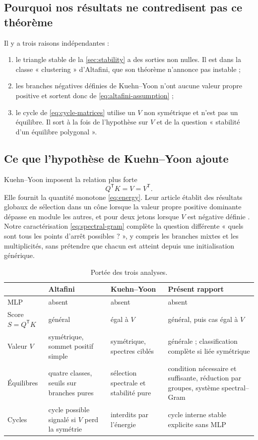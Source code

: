 \documentclass[11pt,a4paper]{article}
\theoremstyle{definition}
\newcommand{\T}{\mathsf T}
\begin{document}
\subsection{Pourquoi nos résultats ne contredisent pas ce théorème}

Il y a trois raisons indépendantes :

\begin{enumerate}
  \item le triangle stable de la \cref{sec:stability} a des sorties non nulles. Il est dans
  la classe « clustering » d'Altafini, que son théorème n'annonce pas instable ;
  \item les branches négatives définies de Kuehn--Yoon n'ont aucune valeur propre
  positive et sortent donc de \eqref{eq:altafini-assumption} ;
  \item le cycle de \eqref{eq:cycle-matrices} utilise un $V$ non symétrique et n'est pas
  un équilibre. Il sort à la fois de l'hypothèse sur $V$ et de la question « stabilité d'un
  équilibre polygonal ».
\end{enumerate}

\subsection{Ce que l'hypothèse de Kuehn--Yoon ajoute}

Kuehn--Yoon imposent la relation plus forte
\[
 Q^{\T}K=V=V^{\T}.
\]
Elle fournit la quantité monotone \eqref{eq:energy}. Leur article établit des résultats
globaux de sélection dans un cône lorsque la valeur propre positive dominante dépasse en
module les autres, et pour deux jetons lorsque $V$ est négative définie
\cite{kuehnyoon2026spectral}. Notre caractérisation \eqref{eq:spectral-gram} complète la
question différente « quels sont tous les points d'arrêt possibles ? », y compris les
branches mixtes et les multiplicités, sans prétendre que chacun est atteint depuis une
initialisation générique.

\begin{table}[ht]
\centering
\caption{Portée des trois analyses.}
\label{tab:scope}
\begin{tabularx}{\textwidth}{@{}lYYY@{}}
\toprule
 & Altafini & Kuehn--Yoon & Présent rapport \\
\midrule
MLP & absent & absent & absent \\
Score $S=Q^{\T}K$ & général & égal à $V$ & général, puis cas égal à $V$ \\
Valeur $V$ & symétrique, sommet positif simple & symétrique, spectres ciblés & générale ; classification complète si liée symétrique \\
Équilibres & quatre classes, seuils sur branches pures & sélection spectrale et stabilité pure & condition nécessaire et suffisante, réduction par groupes, système spectral--Gram \\
Cycles & cycle possible signalé si $V$ perd la symétrie & interdits par l'énergie & cycle interne stable explicite sans MLP \\
\bottomrule
\end{tabularx}
\end{table}
\end{document}
